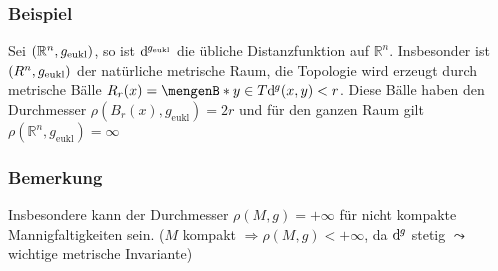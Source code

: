 \subsubsection{Beispiel}
\label{ssub:229}
Sei $(\mathbb{R}^n,g_{\text{eukl}})$, so ist $\mathrm{d}\mkern-1.0mu^{g_{\text{eukl}}}$ die übliche Distanzfunktion auf $\mathds{R}^n$. Insbesonder ist $({R}^n,g_{\text{eukl}})$ der natürliche metrische Raum, die Topologie wird erzeugt durch metrische Bälle $R_r(x)=\set[y\in T]{\mathd^g (x,y) < r}$. Diese Bälle haben den Durchmesser $\rho(B_r(x),g_{\text{eukl}}) = 2r$ und für den ganzen Raum gilt $\rho(\mathds{R}^n,g_{\text{eukl}}) = \infty$

\subsubsection[Bemerkung: Durchmesser kompakter Mannigfaltigkeiten]{Bemerkung}
\label{ssub:230}
Insbesondere kann der Durchmesser $\rho(M,g) = +\infty$ für nicht kompakte Mannigfaltigkeiten sein. ($M$ kompakt $\Rightarrow \rho(M,g) < + \infty$, da $\mathrm{d}\mkern-1.0mu^g$ stetig $\leadsto$ wichtige metrische Invariante)

